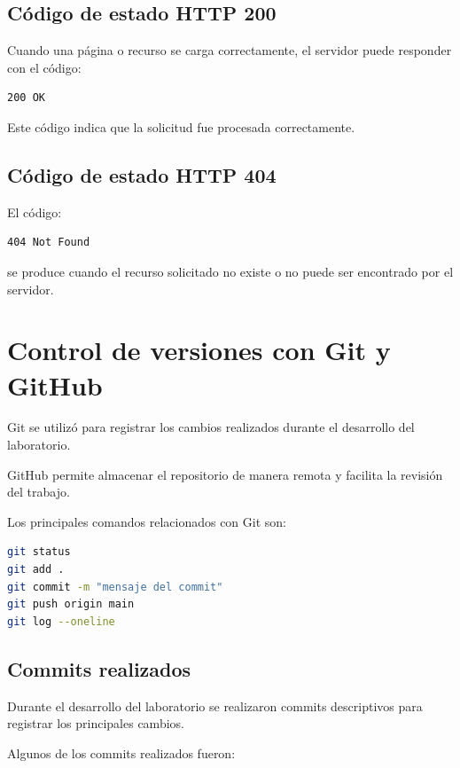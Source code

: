 \documentclass{article}
\begin{document}
\subsection{Código de estado HTTP 200}

Cuando una página o recurso se carga correctamente, el servidor
puede responder con el código:

\begin{lstlisting}[language=bash]
200 OK
\end{lstlisting}

Este código indica que la solicitud fue procesada correctamente.

\subsection{Código de estado HTTP 404}

El código:

\begin{lstlisting}[language=bash]
404 Not Found
\end{lstlisting}

se produce cuando el recurso solicitado no existe o no puede
ser encontrado por el servidor.



\section{Control de versiones con Git y GitHub}

Git se utilizó para registrar los cambios realizados durante
el desarrollo del laboratorio.

GitHub permite almacenar el repositorio de manera remota y
facilita la revisión del trabajo.

Los principales comandos relacionados con Git son:

\begin{lstlisting}[language=bash]
git status
git add .
git commit -m "mensaje del commit"
git push origin main
git log --oneline
\end{lstlisting}


\subsection{Commits realizados}

Durante el desarrollo del laboratorio se realizaron commits
descriptivos para registrar los principales cambios.

Algunos de los commits realizados fueron:
\end{document}
